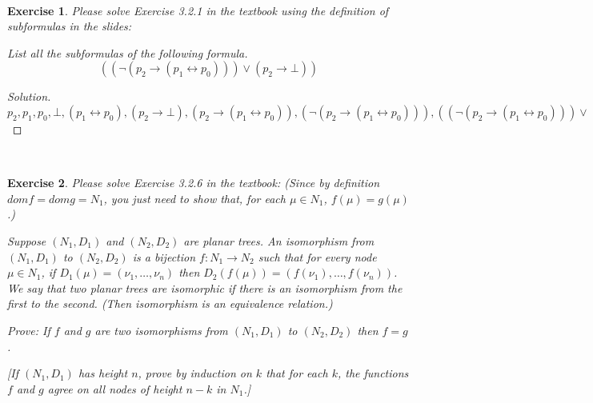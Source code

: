 \documentclass[12pt,a4paper]{article}
\theoremstyle{plain}
\newtheorem{exercise}{Exercise}
\begin{document}
\ \\
\begin{exercise}
Please solve Exercise 3.2.1 in the textbook using the definition of subformulas in the slides:

List all the subformulas of the following formula.
%
\[
((\neg ( p_2 \rightarrow (p_1 \leftrightarrow p_0 ))) \vee ( p_2 \rightarrow \bot ))
\]
\end{exercise}

\begin{proof}[Solution]\
  $p_2, p_1, p_0, \bot, (p_1 \leftrightarrow p_0), ( p_2 \rightarrow \bot ), ( p_2 \rightarrow (p_1 \leftrightarrow p_0 )), (\neg ( p_2 \rightarrow (p_1 \leftrightarrow p_0 ))), ((\neg ( p_2 \rightarrow (p_1 \leftrightarrow p_0 ))) \vee ( p_2 \rightarrow \bot ))$  
\end{proof}

\ \\
\begin{exercise}
Please solve Exercise 3.2.6 in the textbook: 
(Since by definition $dom f = dom g = N_1$, you just need to show that, for each $\mu \in N_1$, $f (\mu) = g (\mu)$.)

Suppose $( N_1 , D_1 )$ and $( N_2 , D_2 )$ are planar trees. 
An \emph{isomorphism} from $( N_1 , D_1 )$ to $( N_2 , D_2 )$ is a bijection $f : N_1 \rightarrow N_2$ such that for every node $\mu \in N_1$, if $D_1 (\mu) = ( \nu_1 , \dots , \nu_n )$ then $D_2 ( f(\mu)) = ( f(\nu_1) , \dots , f(\nu_n) )$. 
We say that two planar trees are \emph{isomorphic} if there is an isomorphism from the first to the second. (Then isomorphism is an equivalence relation.) 

Prove: If $f$ and $g$ are two isomorphisms from $( N_1 , D_1 )$ to $( N_2 , D_2 )$ then $f = g$.

[If $(N_1,D_1)$ has height $n$, prove by induction on $k$ that for each $k$, the functions $f$ and $g$ agree on all nodes of height $n - k$ in $N_1$.]
\end{exercise}
\end{document}
